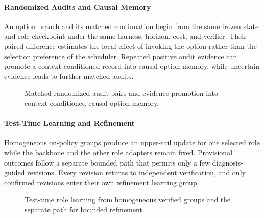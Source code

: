 \paragraph{Randomized Audits and Causal Memory}
An option branch and its matched continuation begin from the same frozen state and role checkpoint under the same harness, horizon, cost, and verifier. Their paired difference estimates the local effect of invoking the option rather than the selection preference of the scheduler. Repeated positive audit evidence can promote a context-conditioned record into causal option memory, while uncertain evidence leads to further matched audits.

\begin{figure}[!htbp]
\centering
\resizebox{\linewidth}{!}{}
\caption{Matched randomized audit pairs and evidence promotion into context-conditioned causal option memory.}
\label{figauditmemory}
\end{figure}

\clearpage

\paragraph{Test-Time Learning and Refinement}
Homogeneous on-policy groups produce an upper-tail update for one selected role while the backbone and the other role adapters remain fixed. Provisional outcomes follow a separate bounded path that permits only a few diagnosis-guided revisions. Every revision returns to independent verification, and only confirmed revisions enter their own refinement learning group.

\begin{figure}[!htbp]
\centering
\resizebox{\linewidth}{!}{}
\caption{Test-time role learning from homogeneous verified groups and the separate path for bounded refinement.}
\label{figtesttimelearning}
\end{figure}
